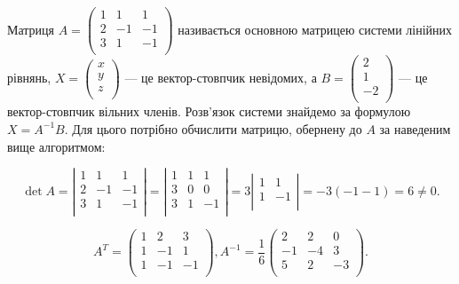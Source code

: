 Матриця $A = \begin{pmatrix}
	1 & 1  & 1  \\
	2 & -1 & -1 \\
	3 & 1  & -1 \\
\end{pmatrix} $ називається основною матрицею системи
лінійних рівнянь, $X = \begin{pmatrix}
	x \\
	y \\
	z \\
\end{pmatrix}$ --- це вектор-стовпчик невідомих, а $B = \begin{pmatrix}
	2 \\
	1 \\
	-2 \\
\end{pmatrix}$ --- це
вектор-стовпчик вільних членів. Розв’язок системи знайдемо за формулою
$X = A^{-1} B$. Для цього потрібно обчислити матрицю, обернену до $A$ за наведеним
вище алгоритмом:

$$\det A = \left| \begin{matrix}
	1 & 1  & 1  \\
	2 & -1 & -1 \\
	3 & 1  & -1 \\
\end{matrix} \right|
= \left| \begin{matrix}
	1 & 1  & 1  \\
	3 & 0  & 0  \\
	3 & 1  & -1 \\
\end{matrix} \right|
= 3 \left| \begin{matrix}
	1 &  1 \\
	1 & -1 \\
\end{matrix} \right|
= -3 (-1 -1) = 6 \neq 0.$$

$$A^T = \begin{pmatrix}
	1 & 2  & 3  \\
	1 & -1 & 1  \\
	1 & -1 & -1 \\
\end{pmatrix}, A^{-1} = \dfrac{1}{6} \begin{pmatrix}
	2  & 2  & 0  \\
	-1 & -4 & 3  \\
	5  & 2  & -3 \\
\end{pmatrix}.$$

